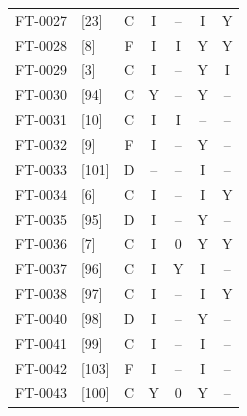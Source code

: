 \begin{longtable}{@{}llccccc@{}}
FT-0027 & [23] & C & I & -- & I & Y \\
FT-0028 & [8] & F & I & I & Y & Y \\
FT-0029 & [3] & C & I & -- & Y & I \\
FT-0030 & [94] & C & Y & -- & Y & -- \\
FT-0031 & [10] & C & I & I & -- & -- \\
FT-0032 & [9] & F & I & -- & Y & -- \\
FT-0033 & [101] & D & -- & -- & I & -- \\
FT-0034 & [6] & C & I & -- & I & Y \\
FT-0035 & [95] & D & I & -- & Y & -- \\
FT-0036 & [7] & C & I & 0 & Y & Y \\
FT-0037 & [96] & C & I & Y & I & -- \\
FT-0038 & [97] & C & I & -- & I & Y \\
FT-0040 & [98] & D & I & -- & Y & -- \\
FT-0041 & [99] & C & I & -- & I & -- \\
FT-0042 & [103] & F & I & -- & I & -- \\
FT-0043 & [100] & C & Y & 0 & Y & -- \\
\end{longtable}

